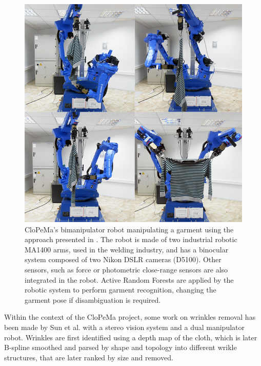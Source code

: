 \begin{figure}[thpb]
    \centering
    \includegraphics[width=0.95
    \textwidth]{figures/SOTA_Doumanoglou_2014.png}
    \caption[CloPeMa's bimanipulator robot manipulating a garment using the approach presented by Doumanoglou et al.]
    {CloPeMa's bimanipulator robot manipulating a garment using the approach presented in \cite{Doumanoglou2014ECCV}. The robot is made of two industrial robotic MA1400 arms, used in the welding industry, and has a binocular system composed of two Nikon DSLR cameras (D5100). Other sensors, such as force or photometric close-range sensors are also integrated in the robot. Active Random Forests are applied by the robotic system to perform garment recognition, changing the garment pose if disambiguation is required.}
    \label{fig:SOTA_Doumanoglou_2014}
\end{figure}


Within the context of the CloPeMa project, some work on wrinkles removal has been made by Sun et al. \cite{Sun2015} with a stereo vision system and a dual manipulator robot. Wrinkles are first identified  using a depth map of the cloth, which is later B-spline smoothed and parsed by shape and topology into different wrikle structures, that are later ranked by size and removed.
